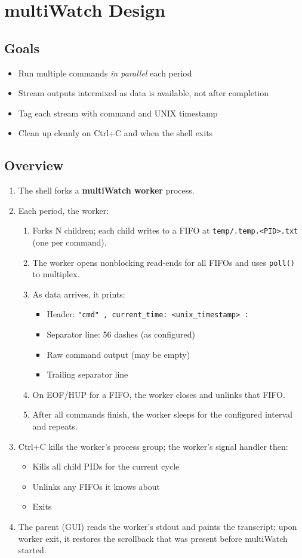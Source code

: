 \documentclass[11pt,a4paper]{article}
\begin{document}
\section{multiWatch Design}
\subsection{Goals}
\begin{itemize}[leftmargin=*]
  \item Run multiple commands \emph{in parallel} each period
  \item Stream outputs intermixed as data is available, not after completion
  \item Tag each stream with command and UNIX timestamp
  \item Clean up cleanly on Ctrl+C and when the shell exits
\end{itemize}

\subsection{Overview}
\begin{enumerate}[leftmargin=*]
\item The shell forks a \textbf{multiWatch worker} process.
\item Each period, the worker:
  \begin{enumerate}
    \item Forks N children; each child writes to a FIFO at \texttt{temp/.temp.\textless PID\textgreater.txt} (one per command).
    \item The worker opens nonblocking read-ends for all FIFOs and uses \texttt{poll()} to multiplex.
    \item As data arrives, it prints:
      \begin{itemize}
        \item Header: \texttt{"cmd" , current\_time: <unix\_timestamp> :}
        \item Separator line: 56 dashes (as configured)
        \item Raw command output (may be empty)
        \item Trailing separator line
      \end{itemize}
    \item On EOF/HUP for a FIFO, the worker closes and unlinks that FIFO.
    \item After all commands finish, the worker sleeps for the configured interval and repeats.
  \end{enumerate}
\item Ctrl+C kills the worker's process group; the worker's signal handler then:
  \begin{itemize}
    \item Kills all child PIDs for the current cycle
    \item Unlinks any FIFOs it knows about
    \item Exits
  \end{itemize}
\item The parent (GUI) reads the worker's stdout and paints the transcript; upon worker exit, it restores the scrollback that was present before multiWatch started.
\end{enumerate}
\end{document}
